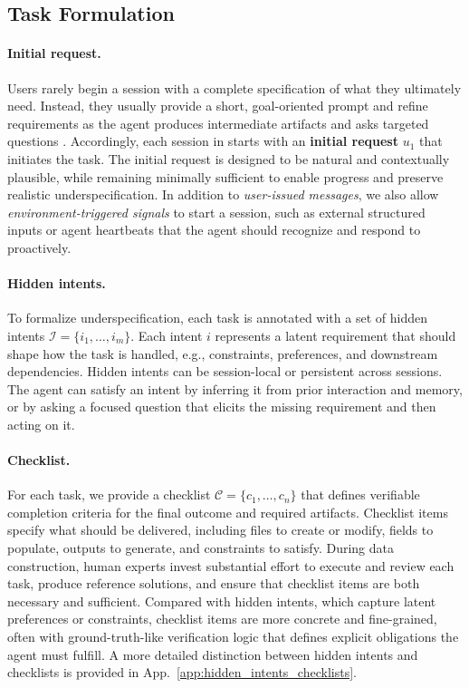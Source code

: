\subsection{Task Formulation}
\label{sec:task_formulation}

\paragraph{Initial request.}
Users rarely begin a session with a complete specification of what they ultimately need. Instead, they usually provide a short, goal-oriented prompt and refine requirements as the agent produces intermediate artifacts and asks targeted questions \citep{vijayvargiya2026asking,chen2024learning,kaur2026proper}. Accordingly, each session in {\bench} starts with an \textbf{initial request} $u_1$ that initiates the task.
The initial request is designed to be natural and contextually plausible, while remaining minimally sufficient to enable progress and preserve realistic underspecification. In addition to \textit{user-issued messages}, we also allow \textit{environment-triggered signals} to start a session, such as external structured inputs or agent heartbeats \citep{nanobot} that the agent should recognize and respond to proactively.

\paragraph{Hidden intents.}
To formalize underspecification, each task is annotated with a set of {hidden intents} $\mathcal{I}=\{i_1,\dots,i_m\}$.
Each intent $i$ represents a latent requirement that should shape how the task is handled, e.g., constraints, preferences, and downstream dependencies. Hidden intents can be session-local or persistent across sessions. The agent can satisfy an intent by inferring it from prior interaction and memory, or by asking a focused question that elicits the missing requirement and then acting on it.

\paragraph{Checklist.}
For each task, we provide a checklist $\mathcal{C}=\{c_1,\dots,c_n\}$ that defines verifiable completion criteria for the final outcome and required artifacts. Checklist items specify what should be delivered, including files to create or modify, fields to populate, outputs to generate, and constraints to satisfy. During data construction, human experts invest substantial effort to execute and review each task, produce reference solutions, and ensure that checklist items are both necessary and sufficient.
Compared with hidden intents, which capture latent preferences or constraints, checklist items are more concrete and fine-grained, often with ground-truth-like verification logic that defines explicit obligations the agent must fulfill. A more detailed distinction between hidden intents and checklists is provided in App.~\ref{app:hidden_intents_checklists}.

